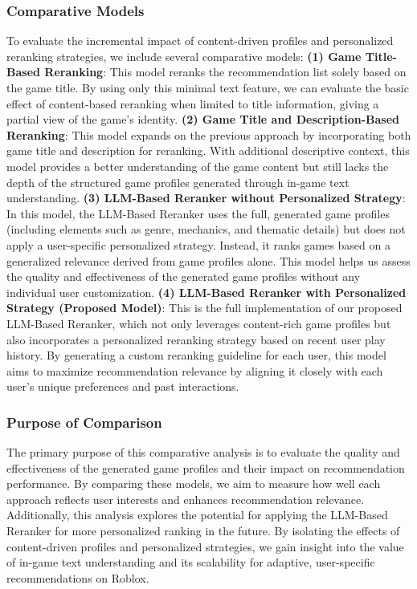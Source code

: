 \subsubsection{Comparative Models}
To evaluate the incremental impact of content-driven profiles and personalized reranking strategies, we include several comparative models:
\textbf{(1) Game Title-Based Reranking}: This model reranks the recommendation list solely based on the game title. By using only this minimal text feature, we can evaluate the basic effect of content-based reranking when limited to title information, giving a partial view of the game’s identity. \textbf{(2) Game Title and Description-Based Reranking}: This model expands on the previous approach by incorporating both game title and description for reranking. With additional descriptive context, this model provides a better understanding of the game content but still lacks the depth of the structured game profiles generated through in-game text understanding. \textbf{(3) LLM-Based Reranker without Personalized Strategy}: In this model, the LLM-Based Reranker uses the full, generated game profiles (including elements such as genre, mechanics, and thematic details) but does not apply a user-specific personalized strategy. Instead, it ranks games based on a generalized relevance derived from game profiles alone. This model helps us assess the quality and effectiveness of the generated game profiles without any individual user customization. \textbf{(4) LLM-Based Reranker with Personalized Strategy (Proposed Model)}: This is the full implementation of our proposed LLM-Based Reranker, which not only leverages content-rich game profiles but also incorporates a personalized reranking strategy based on recent user play history. By generating a custom reranking guideline for each user, this model aims to maximize recommendation relevance by aligning it closely with each user’s unique preferences and past interactions.


\subsubsection{Purpose of Comparison}
The primary purpose of this comparative analysis is to evaluate the quality and effectiveness of the generated game profiles and their impact on recommendation performance. By comparing these models, we aim to measure how well each approach reflects user interests and enhances recommendation relevance. Additionally, this analysis explores the potential for applying the LLM-Based Reranker for more personalized ranking in the future. By isolating the effects of content-driven profiles and personalized strategies, we gain insight into the value of in-game text understanding and its scalability for adaptive, user-specific recommendations on Roblox.

